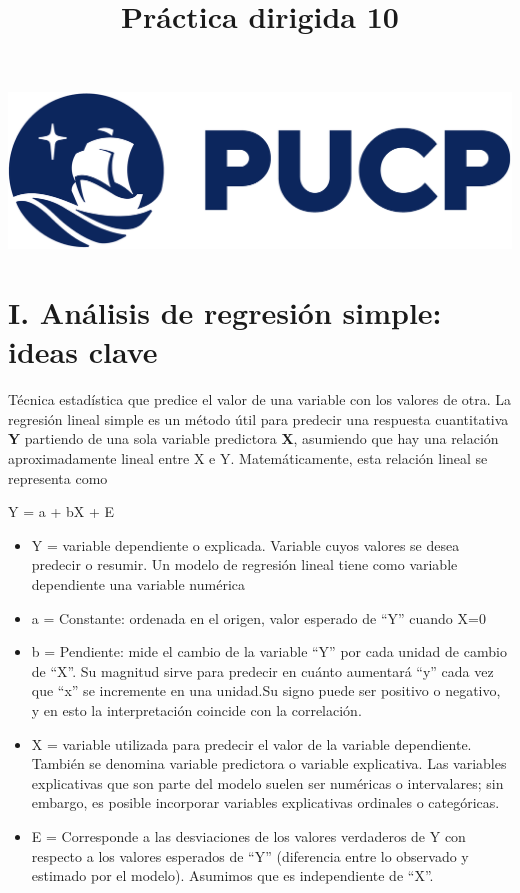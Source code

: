 \documentclass[
]{article}
\title{Práctica dirigida 10}
\author{}
\date{\vspace{-2.5em}}
\begin{document}
\maketitle

{
\setcounter{tocdepth}{1}
\tableofcontents
}
\includegraphics[width=0.3\linewidth]{logoPUCP}

\hypertarget{i.-anuxe1lisis-de-regresiuxf3n-simple-ideas-clave}{%
\section{\texorpdfstring{\textbf{I. Análisis de regresión simple: ideas
clave}}{I. Análisis de regresión simple: ideas clave}}\label{i.-anuxe1lisis-de-regresiuxf3n-simple-ideas-clave}}

Técnica estadística que predice el valor de una variable con los valores
de otra. La regresión lineal simple es un método útil para predecir una
respuesta cuantitativa \textbf{Y} partiendo de una sola variable
predictora \textbf{X}, asumiendo que hay una relación aproximadamente
lineal entre X e Y. Matemáticamente, esta relación lineal se representa
como

Y = a + bX + E

\begin{itemize}
\item
  Y = variable dependiente o explicada. Variable cuyos valores se desea
  predecir o resumir. Un modelo de regresión lineal tiene como variable
  dependiente una variable numérica
\item
  a = Constante: ordenada en el origen, valor esperado de ``Y'' cuando
  X=0
\item
  b = Pendiente: mide el cambio de la variable ``Y'' por cada unidad de
  cambio de ``X''. Su magnitud sirve para predecir en cuánto aumentará
  ``y'' cada vez que ``x'' se incremente en una unidad.Su signo puede
  ser positivo o negativo, y en esto la interpretación coincide con la
  correlación.
\item
  X = variable utilizada para predecir el valor de la variable
  dependiente. También se denomina variable predictora o variable
  explicativa. Las variables explicativas que son parte del modelo
  suelen ser numéricas o intervalares; sin embargo, es posible
  incorporar variables explicativas ordinales o categóricas.
\item
  E = Corresponde a las desviaciones de los valores verdaderos de Y con
  respecto a los valores esperados de ``Y'' (diferencia entre lo
  observado y estimado por el modelo). Asumimos que es independiente de
  ``X''.
\end{itemize}
\end{document}
